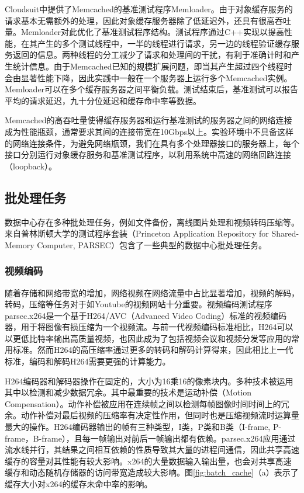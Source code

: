 Cloudsuit中提供了Memcached的基准测试程序Memloader\cite{palit2016demystifying}。由于对象缓存服务的请求基本无需额外的处理，因此对象缓存服务器除了低延迟外，还具有很高吞吐量。Memloader对此优化了基准测试程序结构。测试程序通过C++实现以提高性能，在其产生的多个测试线程中，一半的线程进行请求，另一边的线程验证缓存服务返回的信息。两种线程的分工减少了请求和处理间的干扰，有利于准确计时和产生统计信息。由于Memcached已知的规模扩展问题，即当其产生超过四个线程时会由显著性能下降，因此实践中一般在一个服务器上运行多个Memcached实例。Memloader可以在多个缓存服务器之间平衡负载。测试结束后，基准测试可以报告平均的请求延迟，九十分位延迟和缓存命中率等数据。

Memcached的高吞吐量使得缓存服务器和运行基准测试的服务器之间的网络连接成为性能瓶颈，通常要求其间的连接带宽在10Gbps以上。实验环境中不具备这样的网络连接条件，为避免网络瓶颈，我们在具有多个处理器接口的服务器上，每个接口分别运行对象缓存服务和基准测试程序，以利用系统中高速的网络回路连接（loopback）。

\subsection{批处理任务}
数据中心存在多种批处理任务，例如文件备份，离线图片处理和视频转码压缩等。来自普林斯顿大学的测试程序套装（Princeton Application Repository for Shared-Memory Computer, PARSEC）\cite{bienia11benchmarking}包含了一些典型的数据中心批处理任务。

\subsubsection{视频编码}
随着存储和网络带宽的增加，网络视频在网络流量中占比显著增加，视频的解码，转码，压缩等任务对于如Youtube的视频网站十分重要。视频编码测试程序parsec.x264是一个基于H264/AVC（Advanced Video Coding）标准的视频编码器，用于将图像有损压缩为一个视频流。与前一代视频编码标准相比，H264可以以更低比特率输出高质量视频，也因此成为了包括视频会议和视频分发等应用的常用标准。然而H264的高压缩率通过更多的转码和解码计算得来，因此相比上一代标准，编码和解码H264需要更强的计算能力。

H264编码器和解码器操作在固定的，大小为16乘16的像素块内。多种技术被运用其中以检测和减少数据冗余。其中最重要的技术是运动补偿（Motion Compensation）。动作补偿被应用在连续帧之间以检测每帧图像时间时间上的冗余。动作补偿对最后视频的压缩率有决定性作用，但同时也是压缩视频流时运算量最大的操作。H264编码器输出的帧有三种类型，I类，P类和B类（I-frame, P-frame，B-frame），且每一帧输出对前后一帧输出都有依赖。parsec.x264应用通过流水线并行，其结果之间相互依赖的性质导致其大量的进程间通信，因此共享高速缓存的容量对其性能有较大影响。x264的大量数据输入输出量，也会对共享高速缓存和动态随机存储器的访问带宽造成较大影响。图\ref{fig:batch_cache}（a）表示了缓存大小对x264的缓存未命中率的影响\cite{bienia2008parsec}。

